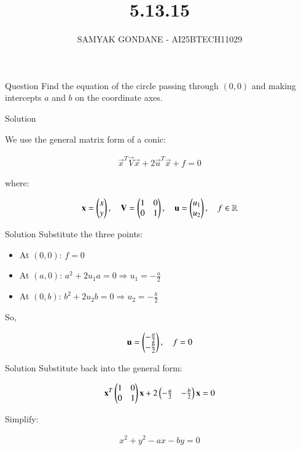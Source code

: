 \documentclass{beamer}
\title 
{5.13.15}
\date{}
\author
{SAMYAK GONDANE - AI25BTECH11029}
\begin{document}
\frame{\titlepage}

\begin{frame}{Question}
Find the equation of the circle passing through $(0, 0)$ and making intercepts $a$ and $b$ on the coordinate axes.
\end{frame}


\begin{frame}{Solution}

We use the general matrix form of a conic:


\begin{align}
\vec{x}^T \vec{V} \vec{x} + 2\vec{u}^T \vec{x} + f = 0
\end{align}


where:


\begin{align}
\mathbf{x} = \begin{pmatrix}x \\ y\end{pmatrix}, \quad
\mathbf{V} = \begin{pmatrix}1 & 0 \\ 0 & 1\end{pmatrix}, \quad
\mathbf{u} = \begin{pmatrix}u_1 \\ u_2\end{pmatrix}, \quad
f \in \mathbb{R}
\end{align}
\end{frame}


\begin{frame}{Solution}
Substitute the three points:

\begin{itemize}
  \item At $(0, 0)$: $f = 0$
  \item At $(a, 0)$: $a^2 + 2u_1 a = 0 \Rightarrow u_1 = -\frac{a}{2}$
  \item At $(0, b)$: $b^2 + 2u_2 b = 0 \Rightarrow u_2 = -\frac{b}{2}$
\end{itemize}

So,


\begin{align}
\mathbf{u} = \begin{pmatrix}-\frac{a}{2} \\ -\frac{b}{2}\end{pmatrix}, \quad f = 0
\end{align}
\end{frame}


\begin{frame}{Solution}
Substitute back into the general form:


\begin{align}
\mathbf{x}^T \begin{pmatrix}1 & 0 \\ 0 & 1\end{pmatrix} \mathbf{x}
+ 2 \begin{pmatrix}-\frac{a}{2} & -\frac{b}{2}\end{pmatrix} \mathbf{x}
= 0
\end{align}



Simplify:


\begin{align}
x^2 + y^2 - ax - by = 0
\end{align}
\end{frame}
\end{document}
